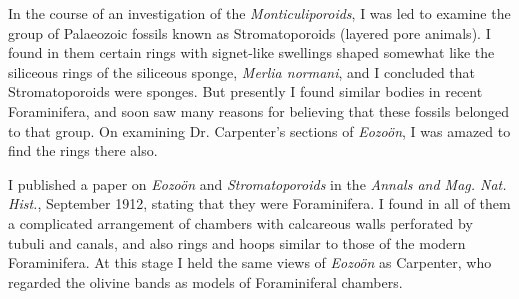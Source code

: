 \documentclass[a4paper, 12pt, oneside]{article}
\begin{document}
In the course of an investigation of the \emph{Monticuliporoids}, I was led to examine the group of Palaeozoic fossils known as Stromatoporoids (layered pore animals). I found in them certain rings with signet-like swellings shaped somewhat like the siliceous rings of the siliceous sponge, \emph{Merlia normani}, and I concluded that Stromatoporoids were sponges. But presently I found similar bodies in recent Foraminifera, and soon saw many reasons for believing that these fossils belonged to that group. On examining Dr. Carpenter's sections of \emph{Eozoön}, I was amazed to find the rings there also.

I published a paper on \emph{Eozoön} and \emph{Stromatoporoids} in the \emph{Annals and Mag. Nat. Hist.}, September 1912, stating that they were Foraminifera. I found in all of them a complicated arrangement of chambers with calcareous walls perforated by tubuli and canals, and also rings and hoops similar to those of the modern Foraminifera. At this stage I held the same views of \emph{Eozoön} as Carpenter, who regarded the olivine bands as models of Foraminiferal chambers.
\end{document}
